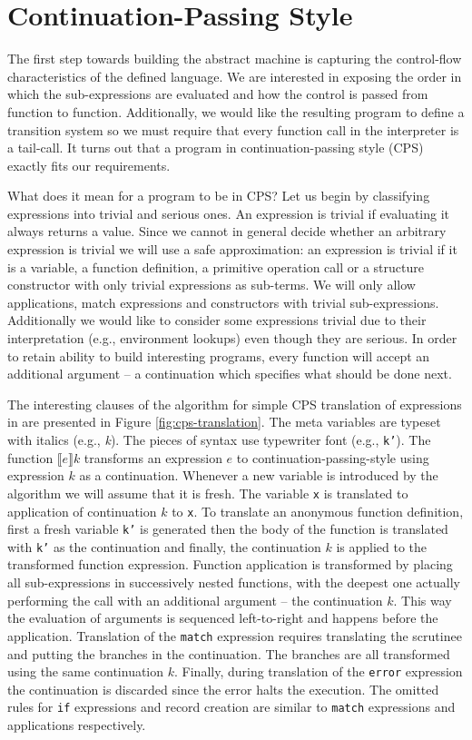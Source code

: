 \section{Continuation-Passing Style}
The first step towards building the abstract machine is capturing the control-flow characteristics of the defined language.
We are interested in exposing the order in which the sub-expressions are evaluated and how the control is passed from function to function.
Additionally, we would like the resulting program to define a transition system so we must require that every function call in the interpreter is a tail-call.
It turns out that a program in continuation-passing style (CPS) exactly fits our requirements.

What does it mean for a program to be in CPS?
Let us begin by classifying expressions into trivial and serious ones.
An expression is trivial if evaluating it always returns a value.
Since we cannot in general decide whether an arbitrary expression is trivial we will use a safe approximation: an expression is trivial if it is a variable, a function definition, a primitive operation call or a structure constructor with only trivial expressions as sub-terms.
We will only allow applications, match expressions and constructors with trivial sub-expressions.
Additionally we would like to consider some expressions trivial due to their interpretation (e.g., environment lookups) even though they are serious.
In order to retain ability to build interesting programs, every function will accept an additional argument -- a continuation which specifies what should be done next.

The interesting clauses of the algorithm for simple CPS translation of expressions in \IDL{} are presented in Figure \ref{fig:cps-translation}.
The meta variables are typeset with italics (e.g., \textit{k}).
The pieces of syntax use typewriter font (e.g., \texttt{k'}).
The function $ \llbracket e \rrbracket k $ transforms an expression $e$ to continuation-passing-style using expression $k$ as a continuation.
Whenever a new variable is introduced by the algorithm we will assume that it is fresh.
The variable \texttt{x} is translated to application of continuation $k$ to \texttt{x}.
To translate an anonymous function definition, first a fresh variable \texttt{k'} is generated then the body of the function is translated with \texttt{k'} as the continuation and finally, the continuation $k$ is applied to the transformed function expression.
Function application is transformed by placing all sub-expressions in successively nested functions, with the deepest one actually performing the call with an additional argument -- the continuation $k$.
This way the evaluation of arguments is sequenced left-to-right and happens before the application.
Translation of the \lstinline{match} expression requires translating the scrutinee and putting the branches in the continuation. The branches are all transformed using the same continuation $k$.
Finally, during translation of the \texttt{error} expression the continuation is discarded since the error halts the execution.
The omitted rules for \texttt{if} expressions and record creation are similar to \texttt{match} expressions and applications respectively.

